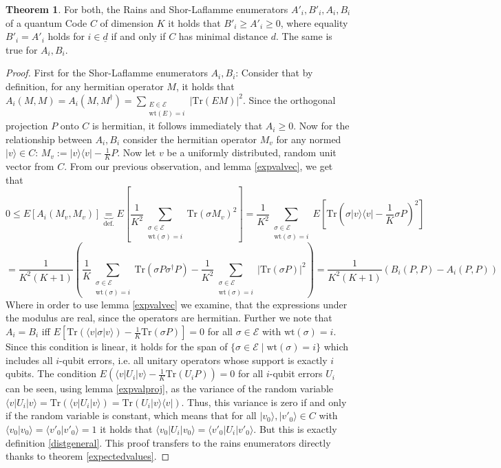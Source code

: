 \documentclass{article}
\def\E{\mathcal{E}}
\def\Tr{\text{Tr}}
\def\wt{\text{wt}}
\theoremstyle{definition}
\newtheorem{theorem}[Satz]{Theorem}
\begin{document}
\begin{theorem}\label{distancenums}
For both, the Rains and Shor-Laflamme enumerators $A'_i, B'_i, A_i, B_i$ of a quantum Code $C$ of dimension $K$ it holds that $B'_i \geq A'_i \geq 0$, where equality $B'_i = A'_i$  holds for $i \in \underline{d}$ if and only if $C$ has minimal distance $d$. The same is true for $A_i, B_i$.
\begin{proof}
First for the Shor-Laflamme enumerators $A_i, B_i$: Consider that by definition, for any hermitian operator $M$, it holds that $A_i(M,M) = A_i(M,M^\dagger) = \sum_{\substack{E \in \mathcal{E} \\ \wt(E) = i}} |\Tr(EM)|^2$. Since the orthogonal projection $P$ onto $C$ is hermitian,
it follows immediately that $A_i \geq 0$. Now for the relationship between $A_i,B_i$ consider the hermitian operator $M_v$ for any normed $|v \rangle \in C$: $M_v:= |v\rangle \langle v| - \frac{1}{K}P$. Now let $v$ be a uniformly distributed, random unit vector from $C$.
From our previous observation, and lemma \ref{expvalvec}, we get that
\begin{equation} 0 \leq E[A_i(M_v,M_v)] \underbrace{=}_{\text{def.}} E[\frac{1}{K^2} \sum_{\substack{\sigma \in \mathcal{E} \\ \wt(\sigma) = i}} \Tr(\sigma M_v)^2] = \frac{1}{K^2}  \sum_{\substack{\sigma \in \mathcal{E} \\ \wt(\sigma) = i}} E[\Tr(\sigma |v\rangle \langle v| - \frac{1}{K} \sigma P)^2] \end{equation}
\begin{equation} = \frac{1}{K^2(K+1)}(\frac{1}{K} \sum_{\substack{\sigma \in \mathcal{E} \\ \wt(\sigma) = i}}  \Tr(\sigma P \sigma^\dagger P) - \frac{1}{K^2}\sum_{\substack{\sigma \in \mathcal{E} \\ \wt(\sigma) = i}} |\Tr(\sigma P)|^2) = \frac{1}{K^2(K+1)} (B_i(P,P) - A_i(P,P)) \end{equation}
Where in order to use lemma \ref{expvalvec} we examine, that the expressions under the modulus are real, since the operators are hermitian. Further we note that $A_i = B_i$ iff $E[\Tr (\langle v | \sigma |v \rangle) - \frac{1}{K} \Tr(\sigma P)] = 0$ for all $\sigma \in \E$ with $\wt(\sigma) = i$.
Since this condition is linear, it holds for the span of $\{ \sigma \in \E \mid \wt(\sigma) = i \}$ which includes all $i$-qubit errors, i.e. all unitary operators whose support is exactly $i$ qubits.
The condition $E(\langle v | U_i | v \rangle - \frac{1}{K}\Tr(U_i P)) = 0$ for all $i$-qubit errors $U_i$ can be seen, using lemma \ref{expvalproj}, as the variance of the random variable $ \langle v | U_i | v \rangle  = \Tr(\langle v | U_i | v \rangle) = \Tr( U_i | v \rangle \langle v |)$.
Thus, this variance is zero if and only if the random variable is constant, which means that for all $ |v_0 \rangle, |v'_0 \rangle \in C$ with $\langle v_0 | v_0 \rangle = \langle v'_0 | v'_0 \rangle = 1$ it holds that $\langle v_0 | U_i | v_0 \rangle = \langle v'_0 | U_i | v'_0 \rangle$.
But this is exactly definition \ref{distgeneral}. This proof transfers to the rains enumerators directly thanks to theorem \ref{expectedvalues}.


\end{proof}
\end{theorem}
\end{document}
